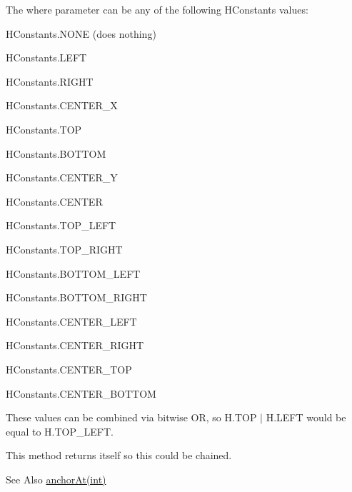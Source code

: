 The {\ttfamily where} parameter can be any of the following H\-Constants values\-:
\begin{DoxyItemize}
\item {\ttfamily H\-Constants.\-N\-O\-N\-E} (does nothing)
\item {\ttfamily H\-Constants.\-L\-E\-F\-T}
\item {\ttfamily H\-Constants.\-R\-I\-G\-H\-T}
\item {\ttfamily H\-Constants.\-C\-E\-N\-T\-E\-R\-\_\-\-X}
\item {\ttfamily H\-Constants.\-T\-O\-P}
\item {\ttfamily H\-Constants.\-B\-O\-T\-T\-O\-M}
\item {\ttfamily H\-Constants.\-C\-E\-N\-T\-E\-R\-\_\-\-Y}
\item {\ttfamily H\-Constants.\-C\-E\-N\-T\-E\-R}
\item {\ttfamily H\-Constants.\-T\-O\-P\-\_\-\-L\-E\-F\-T}
\item {\ttfamily H\-Constants.\-T\-O\-P\-\_\-\-R\-I\-G\-H\-T}
\item {\ttfamily H\-Constants.\-B\-O\-T\-T\-O\-M\-\_\-\-L\-E\-F\-T}
\item {\ttfamily H\-Constants.\-B\-O\-T\-T\-O\-M\-\_\-\-R\-I\-G\-H\-T}
\item {\ttfamily H\-Constants.\-C\-E\-N\-T\-E\-R\-\_\-\-L\-E\-F\-T}
\item {\ttfamily H\-Constants.\-C\-E\-N\-T\-E\-R\-\_\-\-R\-I\-G\-H\-T}
\item {\ttfamily H\-Constants.\-C\-E\-N\-T\-E\-R\-\_\-\-T\-O\-P}
\item {\ttfamily H\-Constants.\-C\-E\-N\-T\-E\-R\-\_\-\-B\-O\-T\-T\-O\-M}
\end{DoxyItemize}

These values can be combined via bitwise O\-R, so {\ttfamily H.\-T\-O\-P $|$ H.\-L\-E\-F\-T} would be equal to {\ttfamily H.\-T\-O\-P\-\_\-\-L\-E\-F\-T}.

This method returns itself so this could be chained. \begin{DoxySeeAlso}{See Also}
\hyperlink{classhype_1_1drawable_1_1_h_drawable_a6d95df0dfd78df98ac6036a30d73f411}{anchor\-At(int)} 
\end{DoxySeeAlso}

